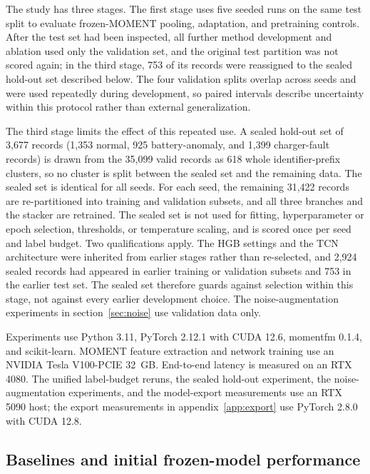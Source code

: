\documentclass{iopjournal}
\begin{document}
The study has three stages. The first stage uses five seeded runs on the same test split to evaluate frozen-MOMENT pooling, adaptation, and pretraining controls. After the test set had been inspected, all further method development and ablation used only the validation set, and the original test partition was not scored again; in the third stage, 753 of its records were reassigned to the sealed hold-out set described below. The four validation splits overlap across seeds and were used repeatedly during development, so paired intervals describe uncertainty within this protocol rather than external generalization.

The third stage limits the effect of this repeated use. A sealed hold-out set of 3,677 records (1,353 normal, 925 battery-anomaly, and 1,399 charger-fault records) is drawn from the 35,099 valid records as 618 whole identifier-prefix clusters, so no cluster is split between the sealed set and the remaining data. The sealed set is identical for all seeds. For each seed, the remaining 31,422 records are re-partitioned into training and validation subsets, and all three branches and the stacker are retrained. The sealed set is not used for fitting, hyperparameter or epoch selection, thresholds, or temperature scaling, and is scored once per seed and label budget. Two qualifications apply. The HGB settings and the TCN architecture were inherited from earlier stages rather than re-selected, and 2,924 sealed records had appeared in earlier training or validation subsets and 753 in the earlier test set. The sealed set therefore guards against selection within this stage, not against every earlier development choice. The noise-augmentation experiments in section~\ref{sec:noise} use validation data only.

Experiments use Python 3.11, PyTorch 2.12.1 with CUDA 12.6, momentfm 0.1.4, and scikit-learn. MOMENT feature extraction and network training use an NVIDIA Tesla V100-PCIE 32~GB. End-to-end latency is measured on an RTX 4080. The unified label-budget reruns, the sealed hold-out experiment, the noise-augmentation experiments, and the model-export measurements use an RTX 5090 host; the export measurements in appendix~\ref{app:export} use PyTorch 2.8.0 with CUDA 12.8.

\subsection{Baselines and initial frozen-model performance}\label{sec:baselines}
\end{document}
